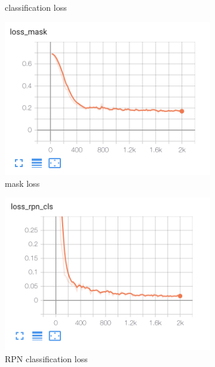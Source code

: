 \documentclass[conference]{IEEEtran}
\begin{document}
\begin{figure}[h!]
\begin{subfigure}[h!]{0.24\textwidth}
    \caption{classification loss}
    \label{fig:loss_cls}
\end{subfigure}
\hfill
\begin{subfigure}[h!]{0.24\textwidth}
    \centering
    \includegraphics[width=\textwidth]{img/loss_mask.png}
    \caption{mask loss}
    \label{fig:loss_mask}
\end{subfigure}
\hfill
\begin{subfigure}[h!]{0.24\textwidth}
    \centering
    \includegraphics[width=\textwidth]{img/loss_rpn_cls.png}
    \caption{RPN classification loss}
    \label{fig:loss_rpn_cls}
\end{subfigure}
\hfill
\begin{subfigure}[h!]{0.24\textwidth}
    \centering

\end{subfigure}
\end{figure}
\end{document}

